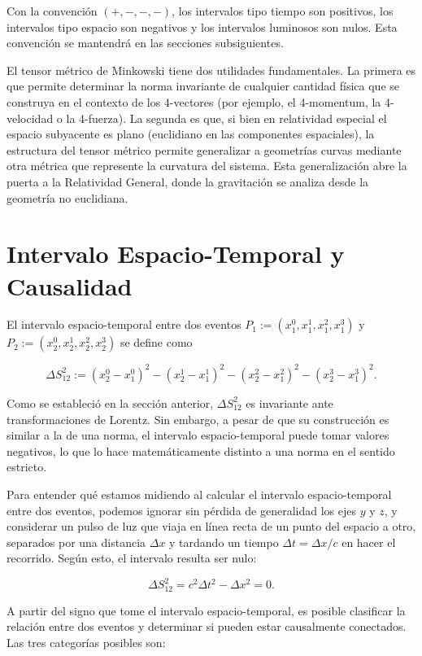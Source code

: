 Con la convención $(+,-,-,-)$, los intervalos tipo tiempo son positivos, los intervalos tipo espacio son negativos y los intervalos luminosos son nulos. Esta convención se mantendrá en las secciones subsiguientes.

El tensor métrico de Minkowski tiene dos utilidades fundamentales. La primera es que permite determinar la norma invariante de cualquier cantidad física que se construya en el contexto de los 4-vectores (por ejemplo, el 4-momentum, la 4-velocidad o la 4-fuerza). La segunda es que, si bien en relatividad especial el espacio subyacente es plano (euclidiano en las componentes espaciales), la estructura del tensor métrico permite generalizar a geometrías curvas mediante otra métrica que represente la curvatura del sistema. Esta generalización abre la puerta a la Relatividad General, donde la gravitación se analiza desde la geometría no euclidiana.

\section{Intervalo Espacio-Temporal y Causalidad}

El intervalo espacio-temporal entre dos eventos $P_1 := (x^0_1, x^1_1, x^2_1, x^3_1)$ y $P_2 := (x^0_2, x^1_2, x^2_2, x^3_2)$ se define como

$$
\Delta S^2_{12} := (x^0_2 - x^0_1)^2 - (x^1_2 - x^1_1)^2 - (x^2_2 - x^2_1)^2 - (x^3_2 - x^3_1)^2.
$$

Como se estableció en la sección anterior, $\Delta S^2_{12}$ es invariante ante transformaciones de Lorentz. Sin embargo, a pesar de que su construcción es similar a la de una norma, el intervalo espacio-temporal puede tomar valores negativos, lo que lo hace matemáticamente distinto a una norma en el sentido estricto.

Para entender qué estamos midiendo al calcular el intervalo espacio-temporal entre dos eventos, podemos ignorar sin pérdida de generalidad los ejes $y$ y $z$, y considerar un pulso de luz que viaja en línea recta de un punto del espacio a otro, separados por una distancia $\Delta x$ y tardando un tiempo $\Delta t = \Delta x/c$ en hacer el recorrido. Según esto, el intervalo resulta ser nulo:

$$
\Delta S^2_{12} = c^2\Delta t^2 - \Delta x^2 = 0.
$$

A partir del signo que tome el intervalo espacio-temporal, es posible clasificar la relación entre dos eventos y determinar si pueden estar causalmente conectados. Las tres categorías posibles son:


